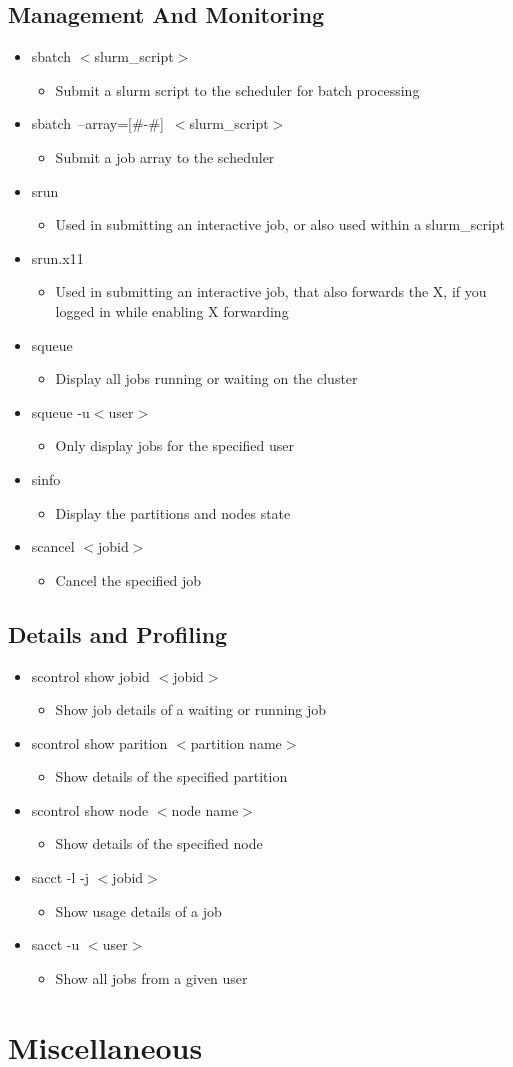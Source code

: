 \documentclass[11pt,twocolumn]{article}
\newcommand{\lft}{$<$}
\newcommand{\rht}{$>$}
\newcommand{\pth}[1]{{\lft}#1{\rht}}
\newcommand{\desc}[1]{\small \begin{itemize}\item[]#1\end{itemize}}
\begin{document}
\subsection{Management And Monitoring}
\begin{itemize}
\item[] sbatch \pth{slurm\_script}\desc{Submit a slurm script to the scheduler for batch processing}
\item[] sbatch~--array=[\#-\#]~\pth{slurm\_script}\desc{Submit a job array to the scheduler}
\item[] srun \desc{Used in submitting an interactive job, or also  used within a slurm\_script}
\item[] srun.x11 \desc{Used in submitting an interactive job, that also forwards the X, if you logged in while enabling X forwarding}
\item{} squeue \desc{Display all jobs running or waiting on the cluster}
\item{} squeue -u{\lft}user{\rht} \desc{Only display jobs for the specified user}
\item{} sinfo \desc{Display the partitions and nodes state}
\item{} scancel {\lft}jobid{\rht} \desc{Cancel the specified job}
\end{itemize}

\subsection{Details and Profiling}
\begin{itemize}
\item[] scontrol show jobid {\lft}jobid{\rht}\desc{Show job details of a waiting or running job}
\item[] scontrol show parition {\lft}partition name{\rht}\desc{Show details of the specified partition}
\item[] scontrol show node {\lft}node name{\rht}\desc{Show details of the specified node}
\item[] sacct -l -j {\lft}jobid{\rht}\desc{Show usage details of a job}
\item[] sacct -u {\lft}user{\rht}\desc{Show all jobs from a given user}
\end{itemize}

\section{Miscellaneous}
\end{document}
